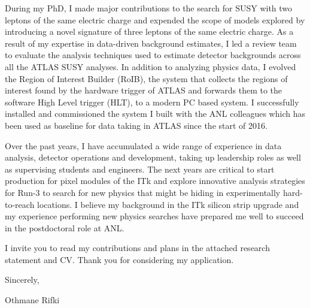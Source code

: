 \documentclass[a4paper]{article}
\begin{document}
During my PhD, I made major contributions to the search for SUSY with two leptons of the same electric charge
 and expended the scope of models explored by introducing a novel signature of three leptons of the same electric charge.
As a result of my expertise in data-driven background estimates,
I led a review team to evaluate the analysis techniques used to estimate detector backgrounds across all the ATLAS SUSY analyses.
In addition to analyzing physics data, I evolved the Region of Interest Builder (RoIB), the system that collects the regions of interest
found by the hardware trigger of ATLAS and forwards them to the software High Level trigger (HLT), to a modern PC based system.
I successfully installed and commissioned the system I built with the ANL colleagues which has been used as baseline for data taking in ATLAS since the start of 2016.

Over the past years, I have accumulated a wide range of experience in data analysis, detector operations and development, taking up leadership roles as well as supervising students and engineers. The next years are critical to start production for pixel modules of the ITk
and explore innovative analysis strategies for Run-3 to search for new  physics that might be hiding in experimentally hard-to-reach locations.
I believe my background in the ITk silicon strip upgrade and my experience performing new physics searches have prepared me
well to succeed in the postdoctoral role at ANL.

I invite you to read my contributions and plans in the attached research statement and CV. Thank you for considering my application.

\vspace{0.25cm}

Sincerely,

\vspace{0.25cm}
Othmane Rifki
\end{document}
